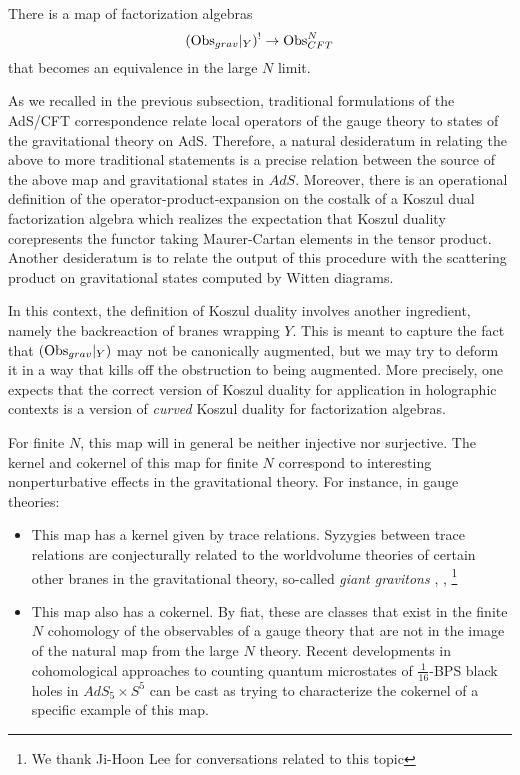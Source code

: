 \begin{expect}\label{twistedholog}
There is a map of factorization algebras
\[
  (\text{Obs}_{grav}|_{Y})^{!}\to \text{Obs}_{CFT}^N
\]
that becomes an equivalence in the large $N$ limit.
\end{expect}

As we recalled in the previous subsection, traditional formulations of the AdS/CFT correspondence relate local operators of the gauge theory to states of the gravitational theory on AdS. Therefore, a natural desideratum in relating the above to more traditional statements is a precise relation between the source of the above map and gravitational states in $AdS$. Moreover, there is an operational definition of the operator-product-expansion on the costalk of a Koszul dual factorization algebra which realizes the expectation that Koszul duality corepresents the functor taking Maurer-Cartan elements in the tensor product. Another desideratum is to relate the output of this procedure with the scattering product on gravitational states computed by Witten diagrams. 

\begin{rmk}
In this context, the definition of Koszul duality involves another ingredient, namely the backreaction of branes wrapping $Y$. This is meant to capture the fact that $(\text{Obs}_{grav}|_Y)$ may not be canonically augmented, but we may try to deform it in a way that kills off the obstruction to being augmented. More precisely, one expects that the correct version of Koszul duality for application in holographic contexts is a version of \textit{curved} Koszul duality for factorization algebras. 
\end{rmk}

\begin{rmk}
For finite $N$, this map will in general be neither injective nor surjective. The kernel and cokernel of this map for finite $N$ correspond to interesting nonperturbative effects in the gravitational theory. For instance, in gauge theories:

\begin{itemize}
\item This map has a kernel given by trace relations. Syzygies between trace relations are conjecturally related to the worldvolume theories of certain other branes in the gravitational theory, so-called \textit{giant gravitons} \cite{Gaiotto:2021xce}, \cite{choi2023quantum}, \cite{Imamura} \footnote{We thank Ji-Hoon Lee for conversations related to this topic}

\item This map also has a cokernel. By fiat, these are classes that exist in the finite $N$ cohomology of the observables of a gauge theory that are not in the image of the natural map from the large $N$ theory. Recent developments in cohomological approaches to counting quantum microstates of $\frac{1}{16}$-BPS black holes in $AdS_5\times S^5$ \cite{choi2023quantum} \cite{Chang_2023} \cite{Chang_2013} can be cast as trying to characterize the cokernel of a specific example of this map. 
\end{itemize}
\end{rmk}

